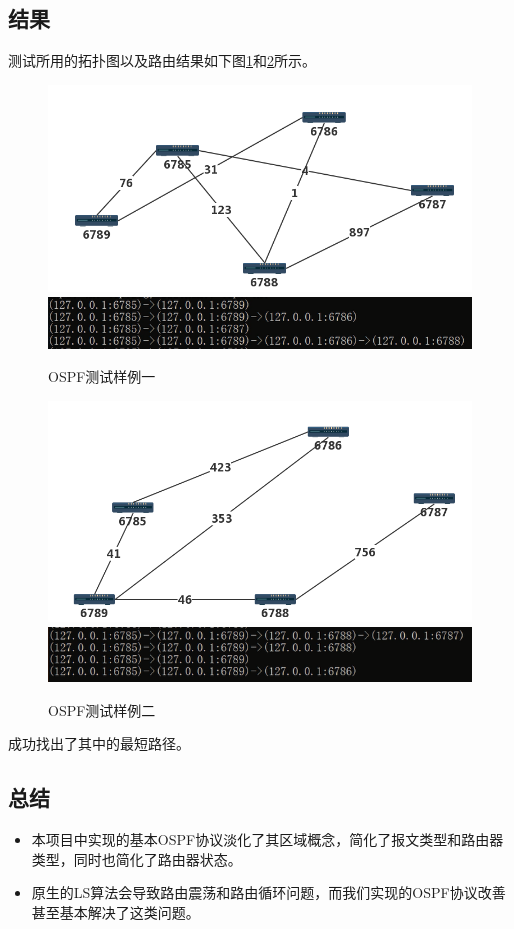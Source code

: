 \subsection{结果} %
\label{sub:结果}
测试所用的拓扑图以及路由结果如下图\ref{fig:ospfTest1}和\ref{fig:ospfTest2}所示。
\begin{figure}[H]
	\centering
	\includegraphics[scale=0.4]{imgs/topo2/tpop1.png}
	\includegraphics[scale=1]{imgs/ospfTest1.PNG}
	\caption{OSPF测试样例一}
	\label{fig:ospfTest1}
\end{figure}
\begin{figure}[H]
	\centering
	\includegraphics[scale=0.4]{imgs/topo2/topo2.png}
	\includegraphics[scale=1]{imgs/ospfTest2.PNG}
	\caption{OSPF测试样例二}
	\label{fig:ospfTest2}
\end{figure}
成功找出了其中的最短路径。
\subsection{总结} %
\label{sub:总结}
\begin{itemize}
	\item 本项目中实现的基本OSPF协议淡化了其区域概念，简化了报文类型和路由器类型，同时也简化了路由器状态。
	\item 原生的LS算法会导致路由震荡和路由循环问题，而我们实现的OSPF协议改善甚至基本解决了这类问题。
\end{itemize}
		
	

